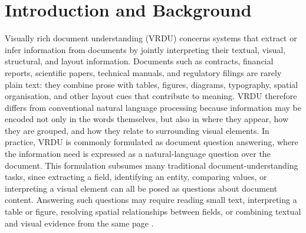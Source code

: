 \documentclass[11pt,twoside,openany]{report}
\begin{document}
\clearpage



\pagestyle{fancy}

\chapter{Introduction and Background}
\label{ch:introduction}

Visually rich document understanding (VRDU) concerns systems that extract or infer information from documents by jointly interpreting their textual, visual, structural, and layout information. Documents such as contracts, financial reports, scientific papers, technical manuals, and regulatory filings are rarely plain text: they combine prose with tables, figures, diagrams, typography, spatial organisation, and other layout cues that contribute to meaning. VRDU therefore differs from conventional natural language processing because information may be encoded not only in the words themselves, but also in where they appear, how they are grouped, and how they relate to surrounding visual elements. In practice, VRDU is commonly formulated as document question answering, where the information need is expressed as a natural-language question over the document. This formulation subsumes many traditional document-understanding tasks, since extracting a field, identifying an entity, comparing values, or interpreting a visual element can all be posed as questions about document content. Answering such questions may require reading small text, interpreting a table or figure, resolving spatial relationships between fields, or combining textual and visual evidence from the same page \citep{mathew2021docvqa}.
\end{document}
